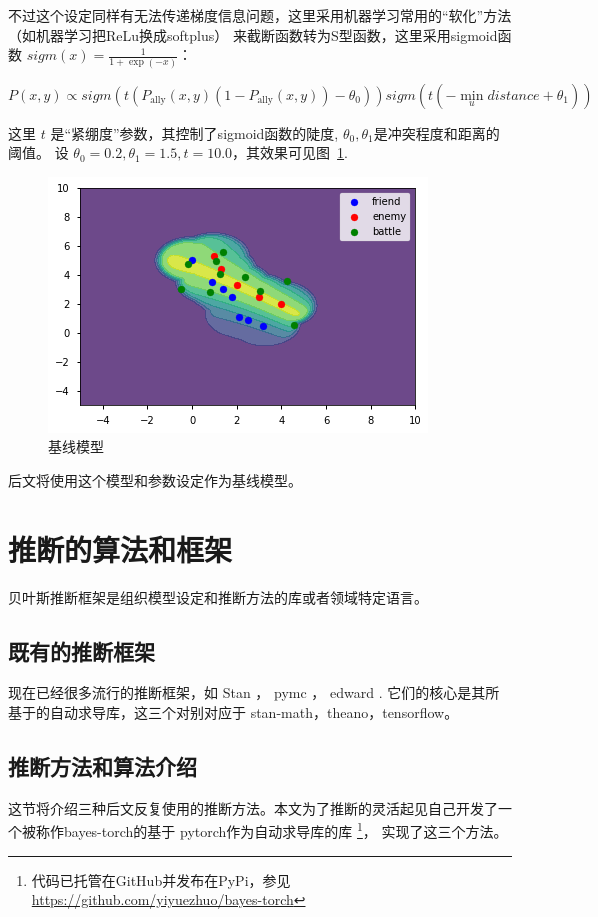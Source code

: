 \documentclass{article}
\begin{document}
不过这个设定同样有无法传递梯度信息问题，这里采用机器学习常用的“软化”方法（如机器学习把ReLu换成softplus）
来截断函数转为S型函数，这里采用sigmoid函数 $sigm(x) = \frac{1}{1+\exp(-x)}$：

$$
P(x,y) \propto sigm(t (P_\text{ally}(x,y) (1-P_\text{ally}(x,y)) - \theta_0)) sigm(t(-\min_{u} distance + \theta_1))
$$


这里 $t$ 是“紧绷度”参数，其控制了sigmoid函数的陡度, $\theta_0,\theta_1$是冲突程度和距离的阈值。
 设 $\theta_0=0.2,\theta_1=1.5,t = 10.0$，其效果可见图~\ref{fig:combSix}.


\begin{figure}[ht]
\includegraphics[width=0.6\linewidth]{comb6.png}
\caption{基线模型}
\label{fig:combSix}
\end{figure}


后文将使用这个模型和参数设定作为基线模型。

\section{推断的算法和框架}


贝叶斯推断框架是组织模型设定和推断方法的库或者领域特定语言。

\subsection{既有的推断框架}


现在已经很多流行的推断框架，如 Stan \cite{carpenter2017stan}，
pymc\cite{patil2010pymc} ， edward \cite{tran2016edward}. 
它们的核心是其所基于的自动求导库，这三个对别对应于 stan-math，theano，tensorflow。


\subsection{推断方法和算法介绍}


这节将介绍三种后文反复使用的推断方法。本文为了推断的灵活起见自己开发了一个被称作bayes-torch的基于
pytorch作为自动求导库的库
\footnote{代码已托管在GitHub并发布在PyPi，参见\url{https://github.com/yiyuezhuo/bayes-torch}}，
实现了这三个方法。
\end{document}
